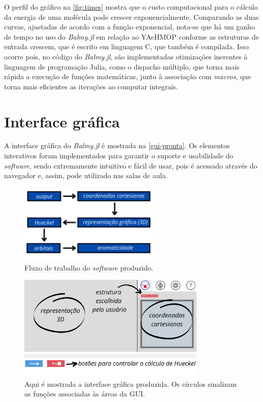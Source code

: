O perfil do gráfico na \autoref{fig:times} mostra que o custo computacional para o cálculo da energia de uma molécula pode crescer exponencialmente. Comparando as duas curvas, ajustadas de acordo com a função exponencial, nota-se que há um ganho de tempo no uso do \textit{Balmy.jl} em relação ao \gls{YAeHMOP} conforme as estruturas de entrada crescem, que é escrito em linguagem C, que também é compilada. Isso ocorre pois, no código do \textit{Balmy.jl}, são implementadas otimizações inerentes à linguagem de programação Julia, como o dispacho múltiplo, que torna mais rápida a execução de funções matemáticas, junto à associação com \textit{macros}, que torna mais eficientes as iterações ao computar integrais.



\section{Interface gráfica}\label{design}

A interface gráfica do \textit{Balmy.jl} é mostrada na \autoref{gui-pronta}. Os elementos interativos foram implementados para garantir o suporte e usabilidade do \textit{software}, sendo extremamente intuitivo e fácil de usar, pois é acessado através do navegador e, assim, pode utilizado nas salas de aula.

\begin{figure}[htb]
	\caption{\label{workflow} Fluxo de trabalho do \textit{software} produzido.}
	\begin{center}
		\includegraphics[width=0.6\textwidth]{images/workflow.png}
	\end{center}
\end{figure}

\begin{figure}[htb]
	\caption{\label{gui-pronta} Aqui é mostrada a interface gráfica produzida. Os círculos sinalizam as funções associadas às áreas da \gls{GUI}.}
	\begin{center}
		\includegraphics[width=0.8\textwidth]{images/GUI-EXAMPLE.png}
	\end{center}
\end{figure}

